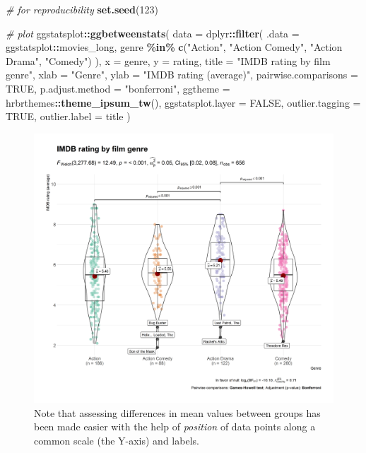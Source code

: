 \documentclass[
]{article}
\newenvironment{Shaded}{\begin{snugshade}}{\end{snugshade}}
\newcommand{\CommentTok}[1]{\textcolor[rgb]{0.56,0.35,0.01}{\textit{#1}}}
\newcommand{\DataTypeTok}[1]{\textcolor[rgb]{0.13,0.29,0.53}{#1}}
\newcommand{\DecValTok}[1]{\textcolor[rgb]{0.00,0.00,0.81}{#1}}
\newcommand{\KeywordTok}[1]{\textcolor[rgb]{0.13,0.29,0.53}{\textbf{#1}}}
\newcommand{\NormalTok}[1]{#1}
\newcommand{\OperatorTok}[1]{\textcolor[rgb]{0.81,0.36,0.00}{\textbf{#1}}}
\newcommand{\OtherTok}[1]{\textcolor[rgb]{0.56,0.35,0.01}{#1}}
\newcommand{\StringTok}[1]{\textcolor[rgb]{0.31,0.60,0.02}{#1}}
\begin{document}
\begin{Shaded}
\begin{Highlighting}[]
\CommentTok{\# for reproducibility}
\KeywordTok{set.seed}\NormalTok{(}\DecValTok{123}\NormalTok{)}

\CommentTok{\# plot}
\NormalTok{ggstatsplot}\OperatorTok{::}\KeywordTok{ggbetweenstats}\NormalTok{(}
  \DataTypeTok{data =}\NormalTok{ dplyr}\OperatorTok{::}\KeywordTok{filter}\NormalTok{(}
    \DataTypeTok{.data =}\NormalTok{ ggstatsplot}\OperatorTok{::}\NormalTok{movies\_long,}
\NormalTok{    genre }\OperatorTok{\%in\%}\StringTok{ }\KeywordTok{c}\NormalTok{(}\StringTok{"Action"}\NormalTok{, }\StringTok{"Action Comedy"}\NormalTok{, }\StringTok{"Action Drama"}\NormalTok{, }\StringTok{"Comedy"}\NormalTok{)}
\NormalTok{  ),}
  \DataTypeTok{x =}\NormalTok{ genre,}
  \DataTypeTok{y =}\NormalTok{ rating,}
  \DataTypeTok{title =} \StringTok{"IMDB rating by film genre"}\NormalTok{,}
  \DataTypeTok{xlab =} \StringTok{"Genre"}\NormalTok{,}
  \DataTypeTok{ylab =} \StringTok{"IMDB rating (average)"}\NormalTok{,}
  \DataTypeTok{pairwise.comparisons =} \OtherTok{TRUE}\NormalTok{,}
  \DataTypeTok{p.adjust.method =} \StringTok{"bonferroni"}\NormalTok{,}
  \DataTypeTok{ggtheme =}\NormalTok{ hrbrthemes}\OperatorTok{::}\KeywordTok{theme\_ipsum\_tw}\NormalTok{(),}
  \DataTypeTok{ggstatsplot.layer =} \OtherTok{FALSE}\NormalTok{,}
  \DataTypeTok{outlier.tagging =} \OtherTok{TRUE}\NormalTok{,}
  \DataTypeTok{outlier.label =}\NormalTok{ title}
\NormalTok{)}
\end{Highlighting}
\end{Shaded}

\begin{figure}[H]
\includegraphics[width=1\linewidth]{./figures/paper-fig1-1} \caption{Note that assessing differences in mean values between groups has been made easier with the help of \textit{position} of data points along a common scale (the Y-axis) and labels.}\label{fig:fig1}
\end{figure}
\end{document}
